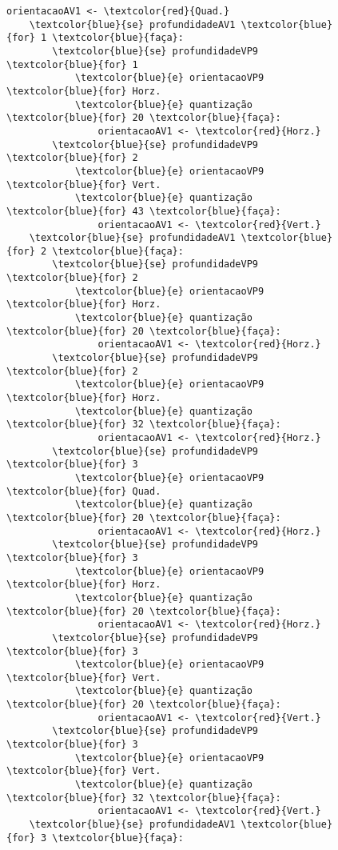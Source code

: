 \begin{figure}
    \centering
    \footnotesize
    \begin{Verbatim}[frame=single,commandchars=\\\{\}]
        orientacaoAV1 <- \textcolor{red}{Quad.}
	\textcolor{blue}{se} profundidadeAV1 \textcolor{blue}{for} 1 \textcolor{blue}{faça}:
		\textcolor{blue}{se} profundidadeVP9 \textcolor{blue}{for} 1 
			\textcolor{blue}{e} orientacaoVP9 \textcolor{blue}{for} Horz. 
			\textcolor{blue}{e} quantização \textcolor{blue}{for} 20 \textcolor{blue}{faça}:
				orientacaoAV1 <- \textcolor{red}{Horz.}
		\textcolor{blue}{se} profundidadeVP9 \textcolor{blue}{for} 2 
			\textcolor{blue}{e} orientacaoVP9 \textcolor{blue}{for} Vert. 
			\textcolor{blue}{e} quantização \textcolor{blue}{for} 43 \textcolor{blue}{faça}:
				orientacaoAV1 <- \textcolor{red}{Vert.}
	\textcolor{blue}{se} profundidadeAV1 \textcolor{blue}{for} 2 \textcolor{blue}{faça}:
		\textcolor{blue}{se} profundidadeVP9 \textcolor{blue}{for} 2 
			\textcolor{blue}{e} orientacaoVP9 \textcolor{blue}{for} Horz. 
			\textcolor{blue}{e} quantização \textcolor{blue}{for} 20 \textcolor{blue}{faça}:
				orientacaoAV1 <- \textcolor{red}{Horz.}
		\textcolor{blue}{se} profundidadeVP9 \textcolor{blue}{for} 2 
			\textcolor{blue}{e} orientacaoVP9 \textcolor{blue}{for} Horz. 
			\textcolor{blue}{e} quantização \textcolor{blue}{for} 32 \textcolor{blue}{faça}:
				orientacaoAV1 <- \textcolor{red}{Horz.}
		\textcolor{blue}{se} profundidadeVP9 \textcolor{blue}{for} 3 
			\textcolor{blue}{e} orientacaoVP9 \textcolor{blue}{for} Quad. 
			\textcolor{blue}{e} quantização \textcolor{blue}{for} 20 \textcolor{blue}{faça}:
				orientacaoAV1 <- \textcolor{red}{Horz.}
		\textcolor{blue}{se} profundidadeVP9 \textcolor{blue}{for} 3 
			\textcolor{blue}{e} orientacaoVP9 \textcolor{blue}{for} Horz. 
			\textcolor{blue}{e} quantização \textcolor{blue}{for} 20 \textcolor{blue}{faça}:
				orientacaoAV1 <- \textcolor{red}{Horz.}
		\textcolor{blue}{se} profundidadeVP9 \textcolor{blue}{for} 3 
			\textcolor{blue}{e} orientacaoVP9 \textcolor{blue}{for} Vert. 
			\textcolor{blue}{e} quantização \textcolor{blue}{for} 20 \textcolor{blue}{faça}:
				orientacaoAV1 <- \textcolor{red}{Vert.}
		\textcolor{blue}{se} profundidadeVP9 \textcolor{blue}{for} 3 
			\textcolor{blue}{e} orientacaoVP9 \textcolor{blue}{for} Vert. 
			\textcolor{blue}{e} quantização \textcolor{blue}{for} 32 \textcolor{blue}{faça}:
				orientacaoAV1 <- \textcolor{red}{Vert.}
	\textcolor{blue}{se} profundidadeAV1 \textcolor{blue}{for} 3 \textcolor{blue}{faça}:

\end{Verbatim}
\end{figure}
